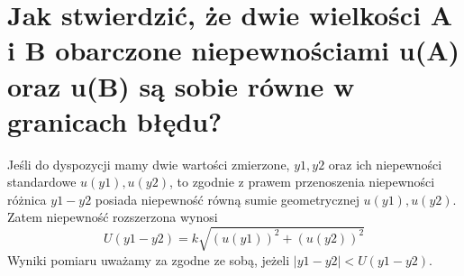 \documentclass[a4paper,11pt]{article} %
\begin{document}
\section{Jak stwierdzić, że dwie wielkości A i B obarczone niepewnościami u(A)
oraz u(B) są sobie równe w granicach błędu? }
Jeśli do dyspozycji mamy dwie wartości zmierzone, $y1, y2$ oraz ich niepewności standardowe $u(y1), u(y2)$, to zgodnie z prawem przenoszenia niepewności różnica $y1-y2$ posiada niepewność równą sumie geometrycznej $u(y1), u(y2)$. \\
Zatem niepewność rozszerzona wynosi
$$ U(y1-y2) = k\sqrt{(u(y1))^2 +(u(y2))^2}$$
Wyniki pomiaru uważamy za zgodne ze sobą, jeżeli $|y1-y2| < U(y1-y2)$.
\end{document}
